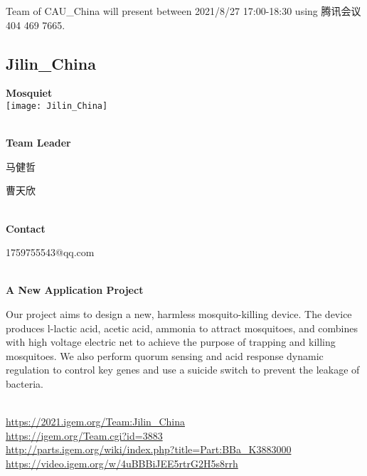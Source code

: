 \vfill{}









Team of CAU\_China will present between   2021/8/27 17:00-18:30      using 腾讯会议 404 469 7665.
\newpage


\subsection{\textcolor{Blu}{ Jilin\_China } }
\vspace{5mm}
\begin{center}
\large{
  \textbf{ Mosquiet }\\
  \texttt{[image: Jilin\_China]}
}
\end{center}
\textbf{\\Team Leader}

  马健哲

  曹天欣


\textbf{\\Contact}

  1759755543@qq.com


\textbf{\\A New Application Project\\}\begin{spacing}{1.5}

Our project aims to design a new, harmless mosquito-killing device. The device produces l-lactic acid, acetic acid, ammonia to attract mosquitoes, and combines with high voltage electric net to achieve the purpose of trapping and killing mosquitoes. We also perform quorum sensing and acid response dynamic regulation to control key genes and use a suicide switch to prevent the leakage of bacteria.\end{spacing}
\\

\url{https://2021.igem.org/Team:Jilin\_China }\\
\url{https://igem.org/Team.cgi?id=3883 }\\
\url{http://parts.igem.org/wiki/index.php?title=Part:BBa_K3883000 }\\
\url{https://video.igem.org/w/4uBBBiJEE5rtrG2H5s8rrh }\\

\vfill{}









